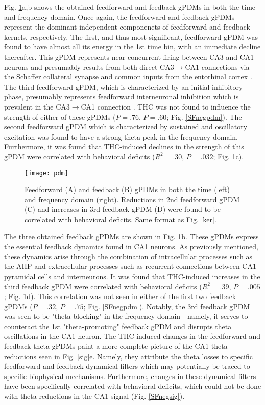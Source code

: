 \documentclass[11pt,a4paper,final]{article}
\begin{document}
Fig. \ref{pdm}a,b shows the obtained feedforward and feedback gPDMs in both the time and frequency domain.
Once again, the feedforward and feedback gPDMs represent the dominant independent componenets of feedforward and feedback kernels, respectively.
The first, and thus most significant, feedforward gPDM was found to have almost all its energy in the 1st time bin, with an immediate decline thereafter.
This gPDM represents near concurrent firing between CA3 and CA1 neurons and presumably results from both direct CA3$\to$CA1 connections via the Schaffer collateral synapse \citep{deadwyler75,sandler15clpp} and common inputs from the entorhinal cortex \citep{jones93,mehta09}.
The third feedforward gPDM, which is characterized by an initial inhibitory phase, presumably represents feedforward interneuronal inhibition which is prevalent in the CA3$\to$CA1 connection \citep{pouille01,zemankovics13}.
THC was not found to influence the strength of either of these gPDMs ($P=.76$, $P=.60$; Fig. \ref{SFnegpdm}).
The second feedforward gPDM which is characterized by sustained and oscillatory excitation was found to have a strong theta peak in the frequency domain.
Furthermore, it was found that THC-induced declines in the strength of this gPDM were correlated with behavioral deficits ($R^2=.30$, $P=.032$; Fig. \ref{pdm}c).

\begin{figure}[!ht]
\centering
\texttt{[image: pdm]}
\caption[PDM Analysis]{
Feedforward (A) and feedback (B) gPDMs in both the time (left) and frequency domain (right).
Reductions in 2nd feedforward gPDM (C) and increases in 3rd feedback gPDM (D) were found to be correlated with behavioral deficits. Same format as Fig. \ref{ker}.}
\label{pdm}
\end{figure}

The three obtained feedback gPDMs are shown in Fig. \ref{pdm}b.
These gPDMs express the essential feedback dynamics found in CA1 neurons.
As previously mentioned, these dynamics arise through the combination of intracellular processes such as the AHP and extracellular processes such as recurrent connections between CA1 pyramidal cells and interneurons.
It was found that THC-induced increases in the third feedback gPDM were correlated with behavioral deficits ($R^2=.39$, $P=.005$; Fig. \ref{pdm}d).
This correlation was not seen in either of the first two feedback gPDMs ($P=.32$, $P=.75$; Fig. \ref{SFnegpdm}).
Notably, the 3rd feedback gPDM was seen to be "theta-blocking" in the frequency domain - namely, it serves to counteract the 1st "theta-promoting" feedback gPDM and disrupts theta oscillations in the CA1 neuron.
The THC-induced changes in the feedforward and feedback theta gPDMs paint a more complete picture of the CA1 theta reductions seen in Fig. \ref{sig}e.
Namely, they attribute the theta losses to specific feedforward and feedback dynamical filters which may potentially be traced to specific biophysical mechanisms.
Furthermore, changes in these dynamical filters have been specifically correlated with behavioral deficits, which could not be done with theta reductions in the CA1 signal (Fig. \ref{SFnegsig}).
\end{document}
